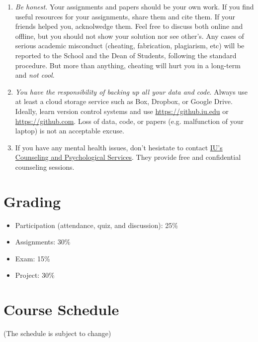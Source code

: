 \documentclass[11pt,article,oneside]{memoir} %
\begin{document}
\begin{enumerate}
\item \emph{Be honest.} Your assignments and papers should be your own work.
If you find useful resources for your assignments, share them and cite them. If
your friends helped you, acknolwedge them. Feel free to discuss both online and
offline, but you should not show your solution nor see other's. Any cases of
serious academic misconduct (cheating, fabrication, plagiarism, etc) will be
reported to the School and the Dean of Students, following the standard
procedure. But more than anything, cheating will hurt you in a long-term and
\emph{not cool}.

\item \emph{You have the responsibility of backing up all your data and code}.
Always use at least a cloud storage service such as Box, Dropbox, or Google
Drive. Ideally, learn version control systems and use
\url{https://github.iu.edu} or \url{https://github.com}. Loss of data, code, or
papers (e.g. malfunction of your laptop) is not an acceptable excuse.

\item If you have any mental health issues, don't hesistate to contact
\href{http://jhealthcenter.indiana.edu/counseling/index.shtml}{IU's Counseling
and Psychological Services}. They provide free and confidential counseling
sessions.


\end{enumerate}
\section{Grading} %
\label{sec:grading_tentative_}

\begin{itemize}

\item Participation (attendance, quiz, and discussion): 25\%

\item Assignments: 30\%

\item Exam: 15\%

\item Project: 30\%

\end{itemize}
\section{Course Schedule} %

(The schedule is subject to change)
\end{document}

